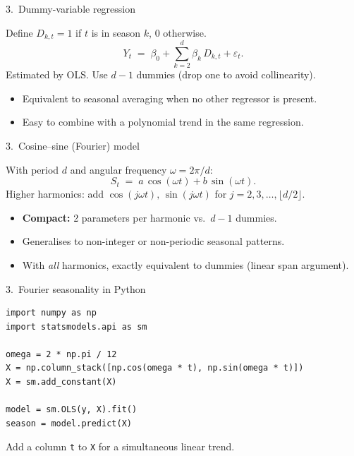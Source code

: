 \documentclass[aspectratio=169]{beamer}
\begin{document}
\begin{frame}{3.~Dummy-variable regression}
  \begin{defbox}
    Define $D_{k,t} = 1$ if $t$ is in season $k$, $0$ otherwise.
    \[
      Y_t \;=\; \beta_0 + \sum_{k=2}^{d} \beta_k\, D_{k,t} + \varepsilon_t.
    \]
    Estimated by OLS. Use $d - 1$ dummies (drop one to avoid collinearity).
  \end{defbox}
  \medskip
  \begin{itemize}
    \item Equivalent to seasonal averaging when no other regressor is
          present.
    \item Easy to combine with a polynomial trend in the same regression.
  \end{itemize}
\end{frame}

\begin{frame}{3.~Cosine--sine (Fourier) model}
  \begin{defbox}
    With period $d$ and angular frequency $\omega = 2\pi / d$:
    \[
      S_t \;=\; a\, \cos(\omega t) + b\, \sin(\omega t).
    \]
    Higher harmonics: add $\cos(j \omega t),\, \sin(j \omega t)$ for
    $j = 2, 3, \dots, \lfloor d/2 \rfloor$.
  \end{defbox}
  \medskip
  \begin{itemize}
    \item \textbf{Compact:} 2 parameters per harmonic vs.\ $d - 1$ dummies.
    \item Generalises to non-integer or non-periodic seasonal patterns.
    \item With \emph{all} harmonics, exactly equivalent to dummies
          (linear span argument).
  \end{itemize}
\end{frame}

\begin{frame}[fragile]{3.~Fourier seasonality in Python}
\begin{lstlisting}
import numpy as np
import statsmodels.api as sm

omega = 2 * np.pi / 12
X = np.column_stack([np.cos(omega * t), np.sin(omega * t)])
X = sm.add_constant(X)

model = sm.OLS(y, X).fit()
season = model.predict(X)
\end{lstlisting}
  \medskip
  Add a column \texttt{t} to \texttt{X} for a simultaneous linear trend.
\end{frame}
\end{document}
